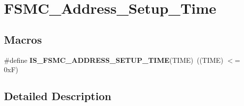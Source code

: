 \hypertarget{group___f_s_m_c___address___setup___time}{}\section{F\+S\+M\+C\+\_\+\+Address\+\_\+\+Setup\+\_\+\+Time}
\label{group___f_s_m_c___address___setup___time}
\subsection*{Macros}
\begin{DoxyCompactItemize}
\item 
\hypertarget{group___f_s_m_c___address___setup___time_ga8b77d090338011abc1be7f4a420e2d8f}{}\#define {\bfseries I\+S\+\_\+\+F\+S\+M\+C\+\_\+\+A\+D\+D\+R\+E\+S\+S\+\_\+\+S\+E\+T\+U\+P\+\_\+\+T\+I\+M\+E}(T\+I\+M\+E)~((T\+I\+M\+E) $<$= 0x\+F)\label{group___f_s_m_c___address___setup___time_ga8b77d090338011abc1be7f4a420e2d8f}

\end{DoxyCompactItemize}


\subsection{Detailed Description}
